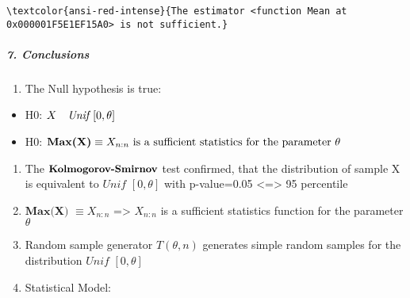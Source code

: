 \documentclass[11pt]{article}
\providecommand{\tightlist}{%
      \setlength{\itemsep}{0pt}\setlength{\parskip}{0pt}}
\begin{document}
    \begin{Verbatim}[commandchars=\\\{\}]
\textcolor{ansi-red-intense}{The estimator <function Mean at 0x000001F5E1EF15A0> is not sufficient.}
    \end{Verbatim}

    \vspace{120px}
    \hypertarget{conclusions}{%
\subparagraph{7. Conclusions}\label{conclusions}}

\begin{enumerate}
\def\labelenumi{\arabic{enumi}.}
\vspace{15px}
\tightlist
\item
  The Null hypothesis is true:
\end{enumerate}

\begin{itemize}
\tightlist
\item
  \(\text{H0}\): \(\space X \text{ ~ } \textit{Unif }[0, \theta]\)

  \vspace{15px}
  \item
  \(\text{H0}\):
  \(\space\textbf{Max(X)}\equiv X_{n:n}\text{ is a sufficient statistics for the parameter }\theta\)
\end{itemize}

\begin{enumerate}
\def\labelenumi{\arabic{enumi}.}
\setcounter{enumi}{1}
\tightlist
\vspace{15px}
\item
  The \(\small{\textbf{Kolmogorov-Smirnov}}\) test confirmed, that the
  distribution of sample X is equivalent to
  \(\textit{Unif }[0, \theta]\) with p-value=0.05
  \textless=\textgreater{} 95 percentile
  \vspace{15px}
\item
  \(\textbf{Max(X)}\) \(\equiv X_{n:n}\) =\textgreater{} \(X_{n:n}\) is
  a sufficient statistics function for the parameter \(\theta\)
  \vspace{15px}
  \item
  Random sample generator \(T(\theta, n)\) generates simple random
  samples for the distribution \(\textit{Unif }[0, \theta]\)
  
\vspace{15px}
\item
  Statistical Model:
\end{enumerate}
\end{document}

